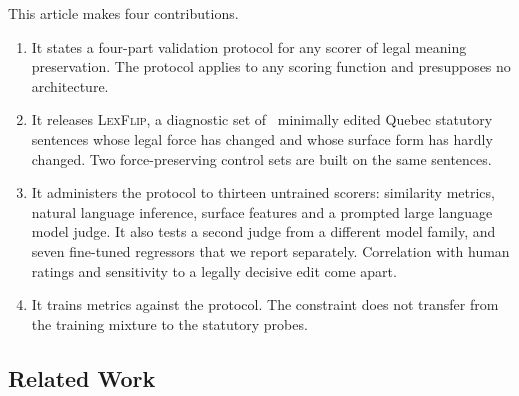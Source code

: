 \documentclass{BVP_JCLLT}
\newcommand{\rev}[1]{#1}
\newcommand{\rev}[1]{{\color{revcol}#1}}
\begin{document}
\rev{This article makes four contributions.

\begin{enumerate}\itemsep1pt
\item It states a four-part validation protocol for any scorer of legal meaning
  preservation. The protocol applies to any scoring function and presupposes no
  architecture.
\item It releases \textsc{LexFlip}, a diagnostic set of \numedits\ minimally
  edited Quebec statutory sentences whose legal force has changed and whose
  surface form has hardly changed. Two force-preserving control sets are built
  on the same sentences.
\item It administers the protocol to thirteen untrained scorers: similarity
  metrics, natural language inference, surface features and a prompted large
  language model judge. It also tests a second judge from a different model
  family, and seven fine-tuned regressors that we report separately. Correlation with
  human ratings and sensitivity to a legally decisive edit come apart.
\item It trains metrics against the protocol. The constraint does not transfer
  from the training mixture to the statutory probes.
\end{enumerate}}

\subsection{Related Work}\label{sec:related}
\end{document}
